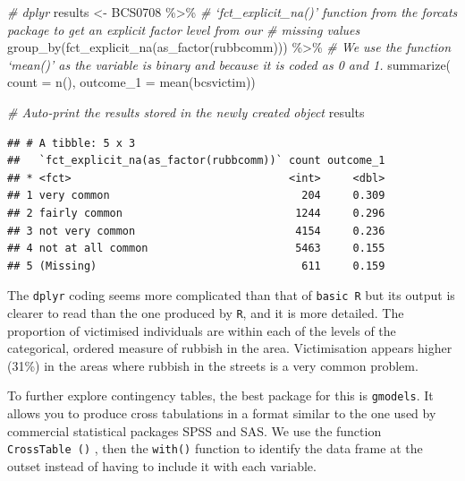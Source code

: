 \documentclass[
]{book}
\newenvironment{Shaded}{\begin{snugshade}}{\end{snugshade}}
\newcommand{\AttributeTok}[1]{\textcolor[rgb]{0.77,0.63,0.00}{#1}}
\newcommand{\CommentTok}[1]{\textcolor[rgb]{0.56,0.35,0.01}{\textit{#1}}}
\newcommand{\FunctionTok}[1]{\textcolor[rgb]{0.00,0.00,0.00}{#1}}
\newcommand{\NormalTok}[1]{#1}
\newcommand{\OtherTok}[1]{\textcolor[rgb]{0.56,0.35,0.01}{#1}}
\newcommand{\SpecialCharTok}[1]{\textcolor[rgb]{0.00,0.00,0.00}{#1}}
\begin{document}
\begin{Shaded}
\begin{Highlighting}[]
\CommentTok{\# dplyr}
\NormalTok{results }\OtherTok{\textless{}{-}}\NormalTok{ BCS0708 }\SpecialCharTok{\%\textgreater{}\%} \CommentTok{\# ‘fct\_explicit\_na()’ function from the forcats package to get an explicit factor level from our \# missing values}
  \FunctionTok{group\_by}\NormalTok{(}\FunctionTok{fct\_explicit\_na}\NormalTok{(}\FunctionTok{as\_factor}\NormalTok{(rubbcomm))) }\SpecialCharTok{\%\textgreater{}\%} 
  \CommentTok{\# We use the function ‘mean()’ as the variable is binary and because it is coded as 0 and 1.}
  \FunctionTok{summarize}\NormalTok{( }\AttributeTok{count =} \FunctionTok{n}\NormalTok{(), }\AttributeTok{outcome\_1 =} \FunctionTok{mean}\NormalTok{(bcsvictim))}

\CommentTok{\# Auto{-}print the results stored in the newly created object }
\NormalTok{results}
\end{Highlighting}
\end{Shaded}

\begin{verbatim}
## # A tibble: 5 x 3
##   `fct_explicit_na(as_factor(rubbcomm))` count outcome_1
## * <fct>                                  <int>     <dbl>
## 1 very common                              204     0.309
## 2 fairly common                           1244     0.296
## 3 not very common                         4154     0.236
## 4 not at all common                       5463     0.155
## 5 (Missing)                                611     0.159
\end{verbatim}

The \texttt{dplyr} coding seems more complicated than that of \texttt{basic\ R} but its output is clearer to read than the one produced by \texttt{R}, and it is more detailed. The proportion of victimised individuals are within each of the levels of the categorical, ordered measure of rubbish in the area. Victimisation appears higher (31\%) in the areas where rubbish in the streets is a very common problem.

To further explore contingency tables, the best package for this is \texttt{gmodels}. It allows you to produce cross tabulations in a format similar to the one used by commercial statistical packages SPSS and SAS. We use the function \texttt{CrossTable\ ()} , then the \texttt{with()} function to identify the data frame at the outset instead of having to include it with each variable.
\end{document}
